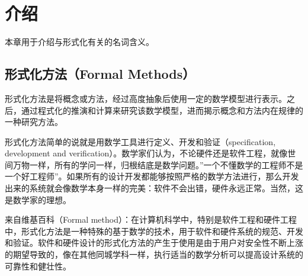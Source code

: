 \documentclass[cs4size,a4pape,UTF8]{ctexart}
\numberwithin{equation}{section}
\numberwithin{table}{section}
\numberwithin{figure}{section}
\begin{document}
\newtheorem{example}{例}              %
\newtheorem{algorithm}{算法}
\newtheorem{theorem}{定理}            %
\newtheorem{definition}{定义}
\newtheorem{axiom}{公理}
\newtheorem{property}{性质}
\newtheorem{proposition}{命题}
\newtheorem{lemma}{引理}
\newtheorem{corollary}{推论}
\newtheorem{remark}{注解}
\newtheorem{condition}{条件}
\newtheorem{conclusion}{结论}
\newtheorem{assumption}{假设}
\renewcommand{\contentsname}{目录}     
\renewcommand{\abstractname}{摘要} 
\renewcommand{\refname}{参考文献}     
\renewcommand{\indexname}{索引}
\renewcommand{\figurename}{图}
\renewcommand{\tablename}{表}
\renewcommand{\appendixname}{附录}
\renewcommand{\proofname}{证明}
\renewcommand{\algorithm}{算法} 

\pagestyle{plain}

\clearpage
\pagestyle{empty}
\tableofcontents 
\thispagestyle{empty}
\pagestyle{fancy}
\newpage
{}%
\section{介绍}
 本章用于介绍与形式化有关的名词含义。
 
\subsection{形式化方法（Formal Methods）}
形式化方法是将概念或方法，经过高度抽象后使用一定的数学模型进行表示。之后，通过程式化的推演和计算来研究该数学模型，进而揭示概念和方法内在规律的一种研究方法。

形式化方法简单的说就是用数学工具进行定义、开发和验证（specification, development and verification）。数学家们认为，不论硬件还是软件工程，就像世间万物一样，所有的学问一样，归根结底是数学问题。''一个不懂数学的工程师不是一个好工程师''。如果所有的设计开发都能够按照严格的数学方法进行，那么开发出来的系统就会像数学本身一样的完美：软件不会出错，硬件永远正常。当然，这是数学家的理想。

来自维基百科（Formal method）：在计算机科学中，特别是软件工程和硬件工程中，形式化方法是一种特殊的基于数学的技术，用于软件和硬件系统的规范、开发和验证。软件和硬件设计的形式化方法的产生于使用是由于用户对安全性不断上涨的期望导致的，像在其他同城学科一样，执行适当的数学分析可以提高设计系统的可靠性和健壮性。
\end{document}
